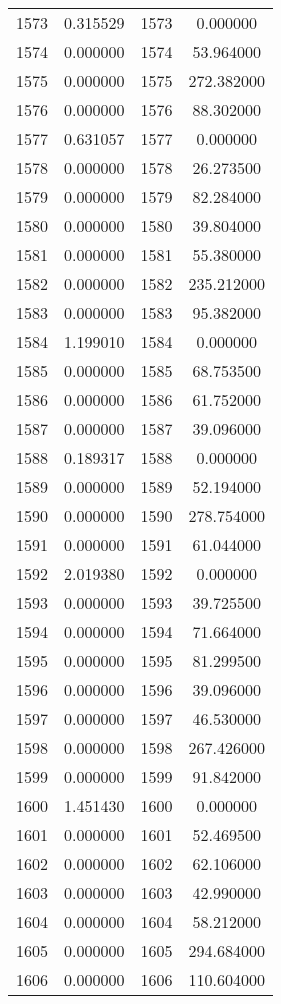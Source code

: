 \documentclass[12pt]{article}
\begin{document}
\begin{longtable}{@{}cccc@{}}
1573 & 0.315529 & 1573 & 0.000000 \\
1574 & 0.000000 & 1574 & 53.964000 \\
1575 & 0.000000 & 1575 & 272.382000 \\
1576 & 0.000000 & 1576 & 88.302000 \\
1577 & 0.631057 & 1577 & 0.000000 \\
1578 & 0.000000 & 1578 & 26.273500 \\
1579 & 0.000000 & 1579 & 82.284000 \\
1580 & 0.000000 & 1580 & 39.804000 \\
1581 & 0.000000 & 1581 & 55.380000 \\
1582 & 0.000000 & 1582 & 235.212000 \\
1583 & 0.000000 & 1583 & 95.382000 \\
1584 & 1.199010 & 1584 & 0.000000 \\
1585 & 0.000000 & 1585 & 68.753500 \\
1586 & 0.000000 & 1586 & 61.752000 \\
1587 & 0.000000 & 1587 & 39.096000 \\
1588 & 0.189317 & 1588 & 0.000000 \\
1589 & 0.000000 & 1589 & 52.194000 \\
1590 & 0.000000 & 1590 & 278.754000 \\
1591 & 0.000000 & 1591 & 61.044000 \\
1592 & 2.019380 & 1592 & 0.000000 \\
1593 & 0.000000 & 1593 & 39.725500 \\
1594 & 0.000000 & 1594 & 71.664000 \\
1595 & 0.000000 & 1595 & 81.299500 \\
1596 & 0.000000 & 1596 & 39.096000 \\
1597 & 0.000000 & 1597 & 46.530000 \\
1598 & 0.000000 & 1598 & 267.426000 \\
1599 & 0.000000 & 1599 & 91.842000 \\
1600 & 1.451430 & 1600 & 0.000000 \\
1601 & 0.000000 & 1601 & 52.469500 \\
1602 & 0.000000 & 1602 & 62.106000 \\
1603 & 0.000000 & 1603 & 42.990000 \\
1604 & 0.000000 & 1604 & 58.212000 \\
1605 & 0.000000 & 1605 & 294.684000 \\
1606 & 0.000000 & 1606 & 110.604000 \\

\end{longtable}
\end{document}
